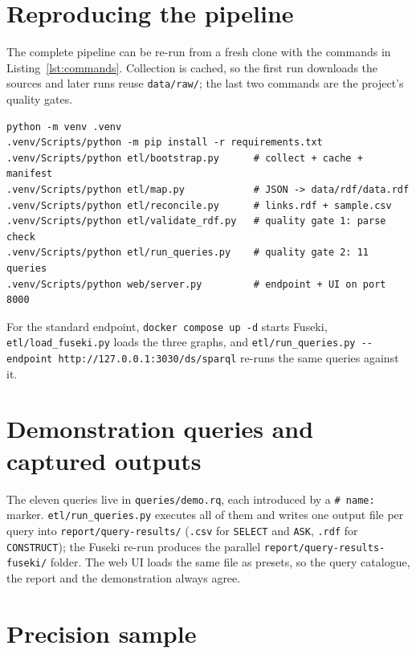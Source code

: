 \appendix

\section{Reproducing the pipeline}

The complete pipeline can be re-run from a fresh clone with the commands in
Listing~\ref{lst:commands}. Collection is cached, so the first run downloads
the sources and later runs reuse \texttt{data/raw/}; the last two commands are
the project's quality gates.

\begin{lstlisting}[frame=single, basicstyle=\ttfamily\small,
    caption={Commands to reproduce the pipeline.},
    label={lst:commands}]
python -m venv .venv
.venv/Scripts/python -m pip install -r requirements.txt
.venv/Scripts/python etl/bootstrap.py      # collect + cache + manifest
.venv/Scripts/python etl/map.py            # JSON -> data/rdf/data.rdf
.venv/Scripts/python etl/reconcile.py      # links.rdf + sample.csv
.venv/Scripts/python etl/validate_rdf.py   # quality gate 1: parse check
.venv/Scripts/python etl/run_queries.py    # quality gate 2: 11 queries
.venv/Scripts/python web/server.py         # endpoint + UI on port 8000
\end{lstlisting}

For the standard endpoint, \texttt{docker compose up -d} starts Fuseki,
\texttt{etl/load\_fuseki.py} loads the three graphs, and
\texttt{etl/run\_queries.py -{}-endpoint http://127.0.0.1:3030/ds/sparql}
re-runs the same queries against it.

\section{Demonstration queries and captured outputs}

The eleven queries live in \texttt{queries/demo.rq}, each introduced by a
\texttt{\# name:} marker. \texttt{etl/run\_queries.py} executes all of them and
writes one output file per query into \texttt{report/query-results/}
(\texttt{.csv} for \texttt{SELECT} and \texttt{ASK}, \texttt{.rdf} for
\texttt{CONSTRUCT}); the Fuseki re-run produces the parallel
\texttt{report/query-results-fuseki/} folder. The web UI loads the same file as
presets, so the query catalogue, the report and the demonstration always agree.

\section{Precision sample}

